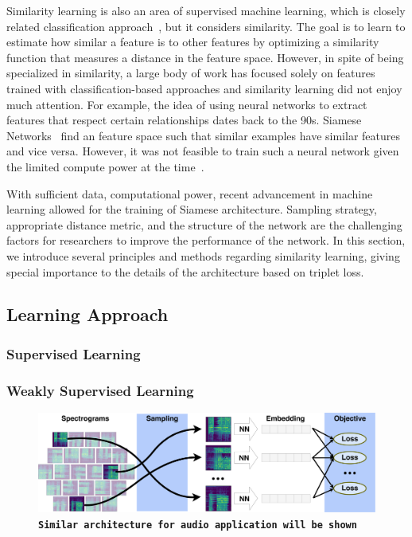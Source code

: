 Similarity learning is also an area of supervised machine learning, which is closely related classification approach~\cite{andrew2018}, but it considers similarity. The goal is to learn to estimate how similar a feature is to other features by optimizing a similarity function that measures a distance in the feature space. However, in spite of being specialized in similarity, a large body of work has focused solely on features trained with classification-based approaches and similarity learning did not enjoy much attention. For example, the idea of using neural networks to extract features that respect certain relationships dates back to the 90s. Siamese Networks~\cite{bromley1993} find an feature space such that similar examples have similar features and vice versa. However, it was not feasible to train such a neural network given the limited compute power at the time~\cite{chao2017}.

With sufficient data, computational power, recent advancement in machine learning allowed for the training of Siamese architecture. Sampling strategy, appropriate distance metric, and the structure of the network are the challenging factors for researchers to improve the performance of the network.  In this section, we introduce several principles and methods regarding similarity learning, giving special importance to the details of the architecture based on triplet loss.

\subsection{Learning Approach}
\subsubsection*{Supervised Learning}
\subsubsection*{Weakly Supervised Learning}

\begin{figure}[htb]
	\centering
	\includegraphics[width=13cm]{Figures/learning_scheme.png}
	\caption{\texttt{\textbf{Similar architecture for audio application will be shown}}}
	\label{deep-model}
\end{figure}

